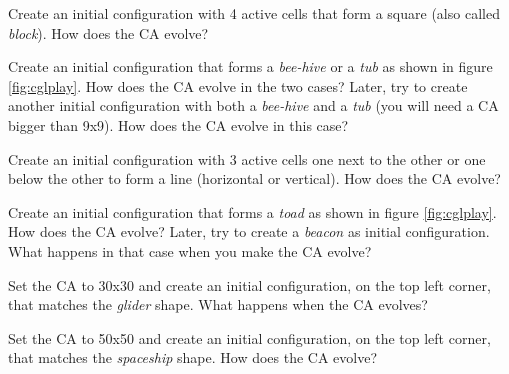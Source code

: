 \begin{problem}
\label{prob:cgl1}
Create an initial configuration with 4 active cells that form a square (also called \textit{block}).
How does the CA evolve?
\end{problem}

\begin{problem}
\label{prob:cgl2}
Create an initial configuration that forms a \textit{bee-hive} or
a \textit{tub} as shown in figure \ref{fig:cglplay}.
How does the CA evolve in the two cases?
Later, try to create another initial configuration with both a
\textit{bee-hive} and a \textit{tub} (you will need a CA bigger than 9x9).
How does the CA evolve in this case?
\end{problem}

\begin{problem}
\label{prob:cgl3}
Create an initial configuration with 3 active cells one next to the other or one
below the other to form a line (horizontal or vertical).
How does the CA evolve?
\end{problem}

\begin{problem}
\label{prob:cgl4}
Create an initial configuration that forms a \textit{toad} as shown in figure \ref{fig:cglplay}.
How does the CA evolve?
Later, try to create a \textit{beacon} as initial configuration. What happens in that
case when you make the CA evolve?
\end{problem}

\begin{problem}
\label{prob:cgl5}
Set the CA to 30x30 and create an initial configuration, on the top left corner, that
matches the \textit{glider} shape. What happens when the CA evolves?
\end{problem}

\begin{problem}
\label{prob:cgl6}
Set the CA to 50x50 and create an initial configuration, on the top left corner, that
matches the \textit{spaceship} shape. How does the CA evolve?
\end{problem}

